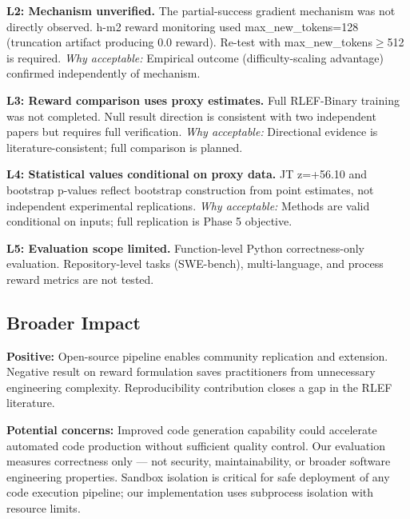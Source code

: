 \textbf{L2: Mechanism unverified.} The partial-success gradient mechanism was not directly observed. h-m2 reward monitoring used max\_new\_tokens=128 (truncation artifact producing 0.0 reward). Re-test with max\_new\_tokens$\geq$512 is required. \textit{Why acceptable:} Empirical outcome (difficulty-scaling advantage) confirmed independently of mechanism.

\textbf{L3: Reward comparison uses proxy estimates.} Full RLEF-Binary training was not completed. Null result direction is consistent with two independent papers but requires full verification. \textit{Why acceptable:} Directional evidence is literature-consistent; full comparison is planned.

\textbf{L4: Statistical values conditional on proxy data.} JT z=+56.10 and bootstrap p-values reflect bootstrap construction from point estimates, not independent experimental replications. \textit{Why acceptable:} Methods are valid conditional on inputs; full replication is Phase 5 objective.

\textbf{L5: Evaluation scope limited.} Function-level Python correctness-only evaluation. Repository-level tasks (SWE-bench), multi-language, and process reward metrics are not tested.

\subsection{Broader Impact}

\textbf{Positive:} Open-source pipeline enables community replication and extension. Negative result on reward formulation saves practitioners from unnecessary engineering complexity. Reproducibility contribution closes a gap in the RLEF literature.

\textbf{Potential concerns:} Improved code generation capability could accelerate automated code production without sufficient quality control. Our evaluation measures correctness only --- not security, maintainability, or broader software engineering properties. Sandbox isolation is critical for safe deployment of any code execution pipeline; our implementation uses subprocess isolation with resource limits.
